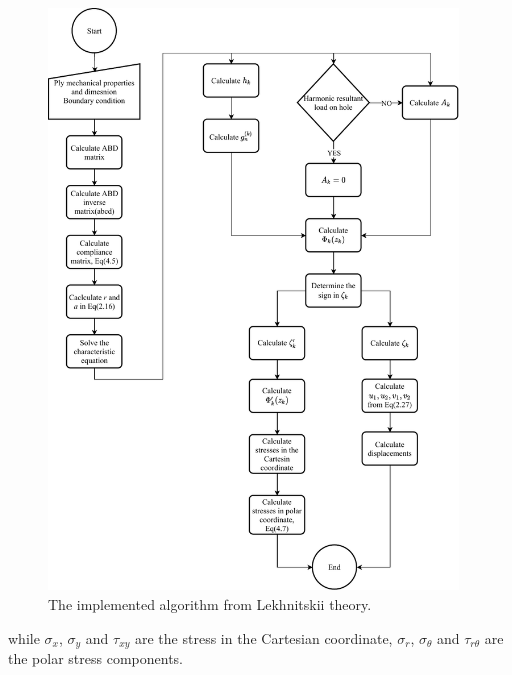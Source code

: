 \documentclass{article}
\begin{document}
\begin{figure}[H]
    \centering
    \includegraphics[width = 0.97\textwidth ]{figures/lekhnitskii_formalism.pdf}
    \caption{The implemented algorithm from Lekhnitskii theory.}
    \label{flow:lekhnitskii_formalism}
\end{figure}

while $\sigma_x$, $\sigma_y$ and $\tau_{xy}$ are the stress in the Cartesian coordinate, $\sigma_r$, $\sigma_{\theta}$ and $\tau_{r\theta}$ are the polar stress components. 
\end{document}
